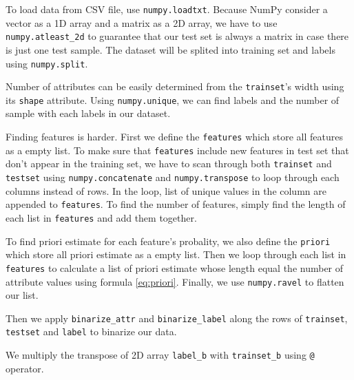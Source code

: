 \documentclass[a4paper]{article}
\newcommand{\code}[1]{\texttt{#1}}
\begin{document}
		

		To load data from CSV file, use \code{numpy.loadtxt}. Because NumPy
		consider a vector as a 1D array and a matrix as a 2D array, we have to use
		\code{numpy.atleast\_2d} to  guarantee that our test set is always a matrix in
		case there is just one test sample. The
		dataset will be splited into training set and labels using \code{numpy.split}.
		
		

		Number of attributes can be easily determined from the
		\code{trainset}'s width using its \code{shape} attribute. Using
		\code{numpy.unique}, we can find labels and the number of sample with each labels in our
		dataset.
		
		

		Finding features is harder. First we define the \code{features}
		which store all features as a empty list. To make sure that \code{features} include new features in test set
		that don't appear in the training set, we have to scan through both
		\code{trainset} and \code{testset} using \code{numpy.concatenate} and
		\code{numpy.transpose} to loop through each columns instead of rows. In the
		loop, list of unique values in the column are appended to \code{features}.
		To find the number of features, simply find the length of each list in
		\code{features} and add them together.

		

		To find priori estimate for each feature's probality, we also define the
		\code{priori} which store all priori estimate as a empty list. Then we loop
		through each list in \code{features} to calculate a list of priori estimate
		whose length equal the number of attribute values using formula
		\eqref{eq:priori}. Finally, we use \code{numpy.ravel} to flatten our list.		

		

		Then we apply \code{binarize\_attr} and \code{binarize\_label} along the
		rows of \code{trainset}, \code{testset} and \code{label} to binarize our
		data.

		

		We multiply the transpose of 2D array \code{label\_b} with \code{trainset\_b}
		using \code{@} operator.
\end{document}
